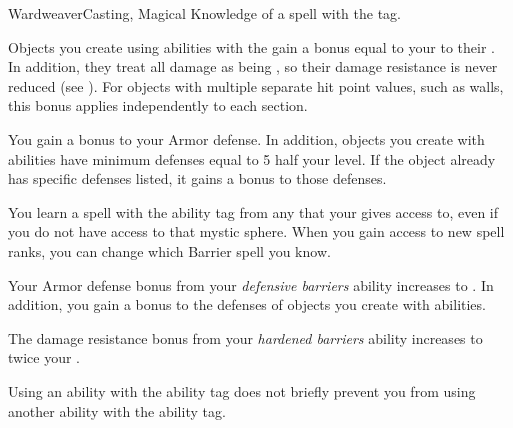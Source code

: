     \begin{feat}{Wardweaver}{Casting, Magical}
        \featpre Knowledge of a spell with the  tag.

         Objects you create using abilities with the   gain a bonus equal to your  to their .
        In addition, they treat all damage as being , so their damage resistance is never reduced (see ).
        For objects with multiple separate hit point values, such as walls, this bonus applies independently to each section.

         You gain a  bonus to your Armor defense.
        In addition, objects you create with  abilities have minimum defenses equal to 5 \add half your level.
        If the object already has specific defenses listed, it gains a  bonus to those defenses.

         You learn a spell with the  ability tag from any  that your  gives access to, even if you do not have access to that mystic sphere.
        When you gain access to new spell ranks, you can change which Barrier spell you know.

         Your Armor defense bonus from your \textit{defensive barriers} ability increases to .
        In addition, you gain a  bonus to the defenses of objects you create with  abilities.

         The damage resistance bonus from your \textit{hardened barriers} ability increases to twice your .

         Using an ability with the  ability tag does not briefly prevent you from using another ability with the  ability tag.
    \end{feat}

